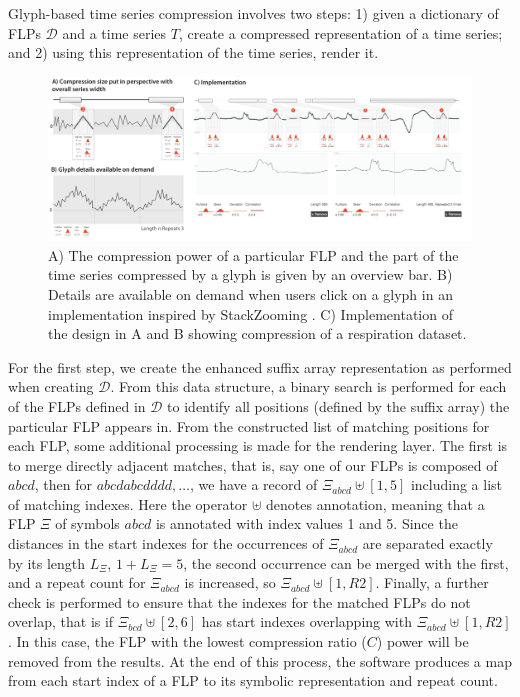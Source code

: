 Glyph-based time series compression involves two steps: 1) given a dictionary of FLPs $\mathcal{D}$ and a time series $T$, create a compressed representation of a time series; and 2) using this representation of the time series, render it. 

\begin{figure}[t!]
\centering
\includegraphics[width=\textwidth]{images/timeseries/glyph_compression_ui}
\caption{A) The compression power of a particular FLP and the part of the time series compressed by a glyph is given by an overview bar. B) Details are available on demand when users click on a glyph in an implementation inspired by StackZooming \cite{javedstack2010}. C) Implementation of the design in A and B showing compression of a respiration dataset.}
\label{fig:glyph_compression_ui}
\end{figure}

For the first step, we create the enhanced suffix array representation as performed when creating $\mathcal{D}$.
From this data structure, a binary search is performed for each of the FLPs defined in $\mathcal{D}$ to identify all positions (defined by the suffix array) the particular FLP appears in.
From the constructed list of matching positions for each FLP, some additional processing is made for the rendering layer.
The first is to merge directly adjacent matches, that is, say one of our FLPs is composed of $abcd$, then for $abcdabcdddd, \ldots$, we have a record of $\Xi_{abcd}\uplus[1,5]$ including a list of matching indexes.
Here the operator $\uplus$ denotes annotation, meaning that a FLP $\Xi$ of symbols $abcd$ is annotated with index values 1 and 5.
Since the distances in the start indexes for the occurrences of $\Xi_{abcd}$ are separated exactly by its length $L_\Xi$,  $1 + L_\Xi = 5$, the second occurrence can be merged with the first, and a repeat count for $\Xi_{abcd}$ is increased, so $\Xi_{abcd}\uplus[{1, R2}]$.
Finally, a further check is performed to ensure that the indexes for the matched FLPs do not overlap, that is if $\Xi_{bcd}\uplus[2,6]$ has start indexes overlapping with $\Xi_{abcd}\uplus[{1,R2}]$. 
In this case, the FLP with the lowest compression ratio ($C$) power will be removed from the results. 
At the end of this process, the software produces a map from each start index of a FLP to its symbolic representation and repeat count. 

